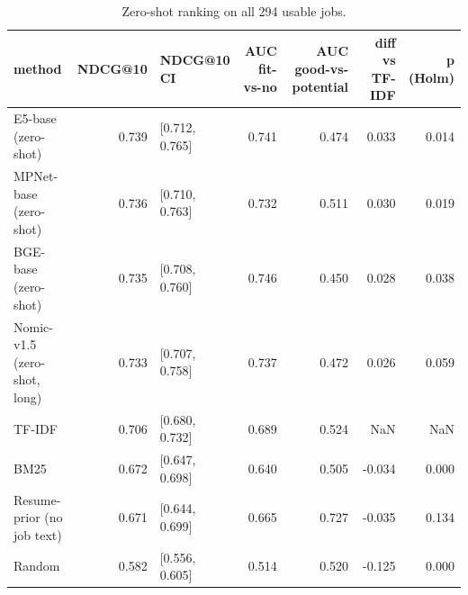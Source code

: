 \begin{table}
\caption{Zero-shot ranking on all 294 usable jobs.}
\label{tab:t3_zero_shot_main}
\begin{tabular}{lrlrrrr}
\toprule
method & NDCG@10 & NDCG@10 CI & AUC fit-vs-no & AUC good-vs-potential & diff vs TF-IDF & p (Holm) \\
\midrule
E5-base (zero-shot) & 0.739 & [0.712, 0.765] & 0.741 & 0.474 & 0.033 & 0.014 \\
MPNet-base (zero-shot) & 0.736 & [0.710, 0.763] & 0.732 & 0.511 & 0.030 & 0.019 \\
BGE-base (zero-shot) & 0.735 & [0.708, 0.760] & 0.746 & 0.450 & 0.028 & 0.038 \\
Nomic-v1.5 (zero-shot, long) & 0.733 & [0.707, 0.758] & 0.737 & 0.472 & 0.026 & 0.059 \\
TF-IDF & 0.706 & [0.680, 0.732] & 0.689 & 0.524 & NaN & NaN \\
BM25 & 0.672 & [0.647, 0.698] & 0.640 & 0.505 & -0.034 & 0.000 \\
Resume-prior (no job text) & 0.671 & [0.644, 0.699] & 0.665 & 0.727 & -0.035 & 0.134 \\
Random & 0.582 & [0.556, 0.605] & 0.514 & 0.520 & -0.125 & 0.000 \\
\bottomrule
\end{tabular}
\end{table}
